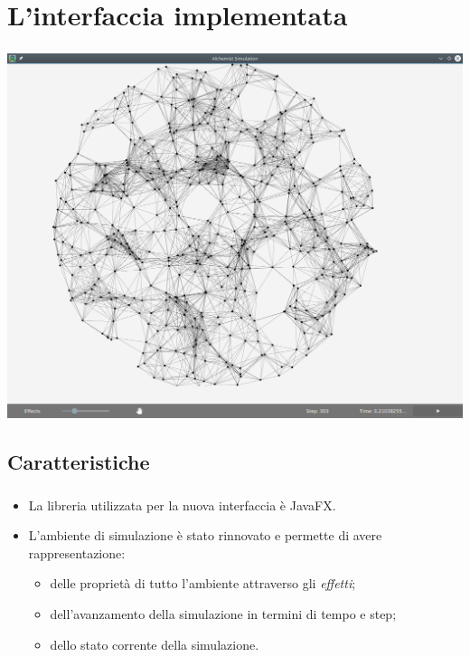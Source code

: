 \documentclass[%
]{beamer}
\newcommand{\engEmph}[1] {\emph{\foreignlanguage{english}#1}}
\begin{document}
    \section{L'interfaccia implementata}\label{sec:new}

    \begin{frame}
        \frametitle{\insertsection}
        \centering
        \includegraphics[scale=0.27]{img/new/window_all}
    \end{frame}

    \subsection{Caratteristiche}\label{subsec:feature}
    \begin{frame}
        \frametitle{\insertsection}
        \framesubtitle{\insertsubsection}
        \begin{itemize}[<+(1)->]
            \item
                La libreria utilizzata per la nuova interfaccia è JavaFX.
            \item
                L'ambiente di simulazione è stato rinnovato e permette di avere rappresentazione:
                \begin{itemize}[<+(1)->]
                    \item delle proprietà di tutto l'ambiente attraverso gli \emph{effetti};
                    \item dell'avanzamento della simulazione in termini di tempo e step;
                    \item dello stato corrente della simulazione.
                \end{itemize}

        \end{itemize}
    \end{frame}
\end{document}
